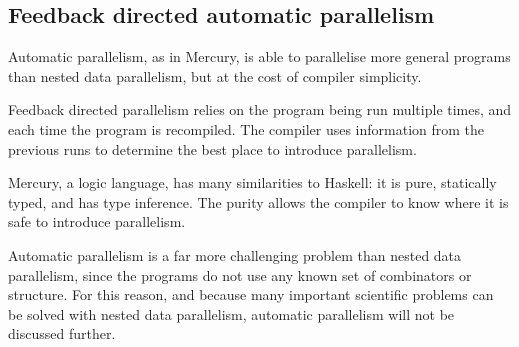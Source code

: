





\subsection{Feedback directed automatic parallelism}

Automatic parallelism, as in Mercury\cite{bone2010automatic},
is able to parallelise more general programs than nested data parallelism,
but at the cost of compiler simplicity.

Feedback directed parallelism relies on the program being run multiple times,
and each time the program is recompiled.
The compiler uses information from the previous runs to determine the best place to introduce parallelism.

Mercury, a logic language, has many similarities to Haskell: it is pure, statically typed, and has type inference.
The purity allows the compiler to know where it is safe to introduce parallelism.

Automatic parallelism is a far more challenging problem than nested data parallelism,
since the programs do not use any known set of combinators or structure.
For this reason, and because many important scientific problems can be solved with nested data parallelism\cite{blelloch1996programming}, 
automatic parallelism will not be discussed further.

